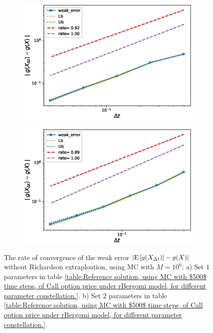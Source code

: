 \begin{figure}[h!]
	\centering
	\begin{subfigure}{.4\textwidth}
		\centering
		\includegraphics[width=1\linewidth]{./figures/rBergomi_weak_error_rates/without_richardson/H_043/weak_convergence_order_Bergomi_H_043_K_1_M_10_6_CI_relative}
		\caption{}
		\label{fig:sub3}
	\end{subfigure}%
	\begin{subfigure}{.4\textwidth}
		\centering
		\includegraphics[width=1\linewidth]{./figures/rBergomi_weak_error_rates/without_richardson/H_007/weak_convergence_order_Bergomi_H_007_K_1_M_10_6_CI_relative}
		\caption{}
		\label{fig:sub4}
	\end{subfigure}
	
	\caption{The rate of convergence of the weak error  $\left\lvert\mathrm{E}\left[g(X_{\Delta t})\right]-g(X)\right\rvert$  without Richardson extraploation, using MC with $M=10^6$: a) Set $1$ parameters in table \ref{table:Reference solution, using MC with $500$ time steps, of Call option price under rBergomi model, for different parameter constellation.}.  b) Set $2$ parameters in table \ref{table:Reference solution, using MC with $500$ time steps, of Call option price under rBergomi model, for different parameter constellation.}.}
	\label{fig:Weak_rate_set1_set_2_without_rich}
\end{figure}





